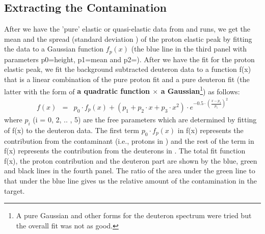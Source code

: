 \subsection{Extracting the Contamination}
After we have the 'pure' elastic or quasi-elastic data from  and  runs, we get the mean and the spread 
(standard deviation \sigm) %
of the proton elastic peak by fitting the  data to a Gaussian function $f_p(x)$ (the blue line in the third panel with parameters p0=height, p1=mean and p2=\sigm). After we have the fit for the proton elastic peak, we fit the background subtracted deuteron data to a function f(x) that is a linear combination of the pure proton fit and a pure deuteron fit (the latter with the form of \textbf{a quadratic function $\times$ a Gaussian}\footnote{A pure Gaussian and other forms for the deuteron spectrum were tried but the overall fit was not as good.}) as follows:
\begin{eqnarray}
f(x)  & = & p_0\cdot f_p(x) + (p_1 + p_2\cdot x + p_3\cdot x^2)\cdot e^{- 0.5\cdot \left(\frac{x-p_4}{p_5}\right)^2}
\label{eq:deutFit}
\end{eqnarray}
where $p_i$ (i = 0, 2, .. , 5) are the free parameters which are determined by fitting of f(x) to the deuteron data. The first term $p_0\cdot f_p(x)$ in f(x) represents the contribution from the contaminant (i.e., protons in ) and the rest of the term in f(x) represents the contribution from the deuterons in . The total fit function f(x), the proton contribution and the deuteron part are shown by the blue, green and black lines in the fourth panel. The ratio of the area under the green line to that under the blue line gives us the relative amount of the  contamination in the  target.

